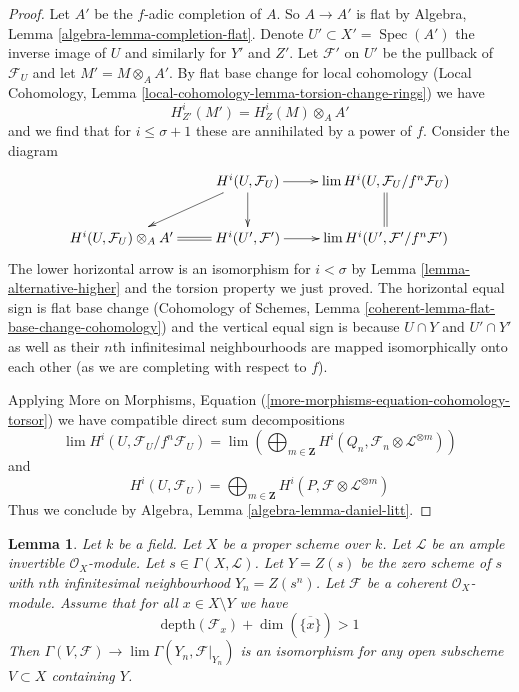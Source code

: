 \documentclass{stacks-project}
\theoremstyle{plain}
\newtheorem{lemma}[subsection]{Lemma}
\theoremstyle{definition}
\theoremstyle{remark}
\numberwithin{equation}{subsection}
\def\lim{\mathop{\mathrm{lim}}\nolimits}
\def\Spec{\mathop{\mathrm{Spec}}}
\begin{document}
\begin{proof}
\medskip\noindent
Let $A'$ be the $f$-adic completion of $A$. So $A \to A'$ is flat by
Algebra, Lemma \ref{algebra-lemma-completion-flat}.
Denote $U' \subset X' = \Spec(A')$ the inverse image of
$U$ and similarly for $Y'$ and $Z'$. Let $\mathcal{F}'$
on $U'$ be the pullback of $\mathcal{F}_U$ and let
$M' = M \otimes_A A'$.
By flat base change for local cohomology
(Local Cohomology, Lemma \ref{local-cohomology-lemma-torsion-change-rings})
we have
$$
H^i_{Z'}(M') = H^i_Z(M) \otimes_A A'
$$
and we find that for $i \leq \sigma + 1$
these are annihilated by a power of $f$. Consider the diagram
$$
\xymatrix{
& H^i(U, \mathcal{F}_U) \ar[ld] \ar[d] \ar[r] &
\lim H^i(U, \mathcal{F}_U/f^n\mathcal{F}_U) \ar@{=}[d] \\
H^i(U, \mathcal{F}_U) \otimes_A A' \ar@{=}[r] &
H^i(U', \mathcal{F}') \ar[r] &
\lim H^i(U', \mathcal{F}'/f^n\mathcal{F}')
}
$$
The lower horizontal arrow is an isomorphism for $i < \sigma$ by
Lemma \ref{lemma-alternative-higher} and the torsion
property we just proved. The horizontal equal sign is flat base change
(Cohomology of Schemes, Lemma \ref{coherent-lemma-flat-base-change-cohomology})
and the vertical equal sign is because $U \cap Y$ and $U' \cap Y'$
as well as their $n$th infinitesimal neighbourhoods
are mapped isomorphically onto each other (as we are
completing with respect to $f$).

\medskip\noindent
Applying More on Morphisms, Equation
(\ref{more-morphisms-equation-cohomology-torsor})
we have compatible direct sum decompositions
$$
\lim H^i(U, \mathcal{F}_U/f^n\mathcal{F}_U) =
\lim
\left(
\bigoplus\nolimits_{m \in \mathbf{Z}}
H^i(Q_n, \mathcal{F}_n \otimes \mathcal{L}^{\otimes m})
\right)
$$
and
$$
H^i(U, \mathcal{F}_U) =
\bigoplus\nolimits_{m \in \mathbf{Z}}
H^i(P, \mathcal{F} \otimes \mathcal{L}^{\otimes m})
$$
Thus we conclude by Algebra, Lemma \ref{algebra-lemma-daniel-litt}.
\end{proof}

\begin{lemma}
\label{lemma-lefschetz-addendum}
Let $k$ be a field. Let $X$ be a proper scheme over $k$.
Let $\mathcal{L}$ be an ample invertible $\mathcal{O}_X$-module.
Let $s \in \Gamma(X, \mathcal{L})$. Let $Y = Z(s)$ be the
zero scheme of $s$ with $n$th infinitesimal neighbourhood $Y_n = Z(s^n)$.
Let $\mathcal{F}$ be a coherent $\mathcal{O}_X$-module.
Assume that for all $x \in X \setminus Y$ we have
$$
\text{depth}(\mathcal{F}_x) + \dim(\overline{\{x\}}) > 1
$$
Then $\Gamma(V, \mathcal{F}) \to \lim \Gamma(Y_n, \mathcal{F}|_{Y_n})$
is an isomorphism for any open subscheme $V \subset X$ containing $Y$.
\end{lemma}
\end{document}
